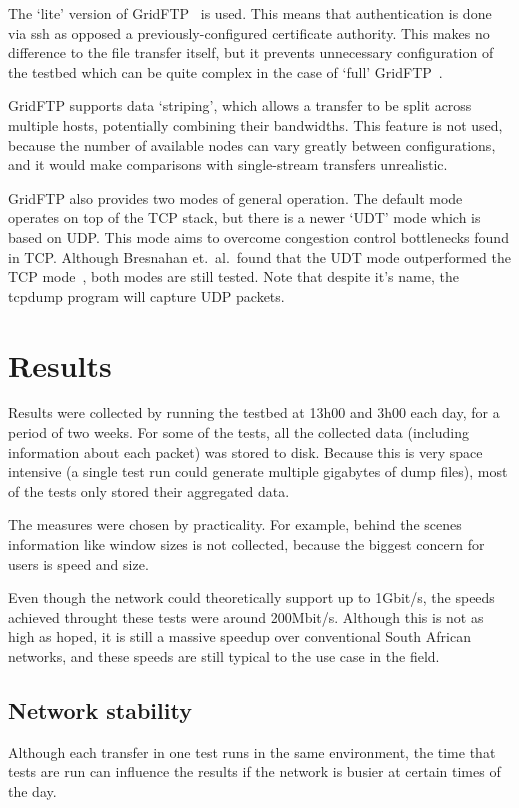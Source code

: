 \documentclass{sig-alternate-05-2015}
\begin{document}
The `lite' version of GridFTP~\cite{allcock2005globus} is used. This means that authentication is done via ssh as opposed a previously-configured certificate authority. This makes no difference to the file transfer itself, but it prevents unnecessary configuration of the testbed which can be quite complex in the case of `full' GridFTP~\cite{gridftplite}.

GridFTP supports data `striping', which allows a transfer to be split across multiple hosts, potentially combining their bandwidths. This feature is not used, because the number of available nodes can vary greatly between configurations, and it would make comparisons with single-stream transfers unrealistic.

GridFTP also provides two modes of general operation. The default mode operates on top of the TCP stack, but there is a newer `UDT' mode which is based on UDP\@. This mode aims to overcome congestion control bottlenecks found in TCP\@. Although Bresnahan et.\ al.\ found that the UDT mode outperformed the TCP mode~\cite{bresnahan2009udt}, both modes are still tested. Note that despite it's name, the tcpdump program will capture UDP packets.

\section{Results}
Results were collected by running the testbed at 13h00 and 3h00 each day, for a period of two weeks. For some of the tests, all the collected data (including information about each packet) was stored to disk. Because this is very space intensive (a single test run could generate multiple gigabytes of dump files), most of the tests only stored their aggregated data. 

The measures were chosen by practicality. For example, behind the scenes information like window sizes is not collected, because the biggest concern for users is speed and size.

Even though the network could theoretically support up to 1Gbit/s, the speeds achieved throught these tests were around 200Mbit/s. Although this is not as high as hoped, it is still a massive speedup over conventional South African networks, and these speeds are still typical to the use case in the field.

\subsection{Network stability}
Although each transfer in one test runs in the same environment, the time that tests are run can influence the results if the network is busier at certain times of the day.
\end{document}
